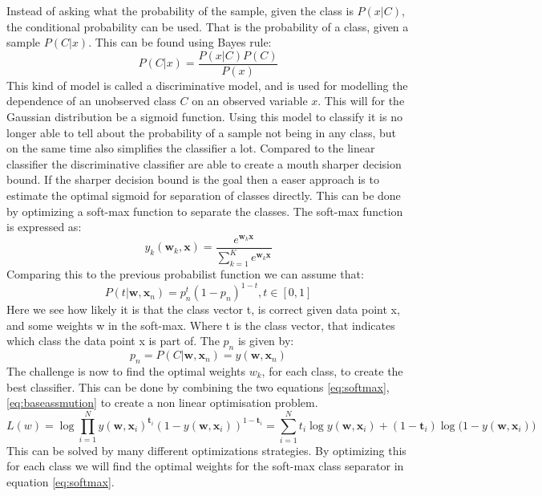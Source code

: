 Instead of asking what the probability of the sample, given the class is $P(x|C)$, the conditional probability can be used. That is the probability of a class, given a sample $P(C|x)$. This can be found using Bayes rule:
\begin{equation}
 P(C|x)=\frac{P(x|C)P(C)}{P(x)}
\end{equation}
This kind of model is called a discriminative model, and is used for modelling the dependence of an unobserved class $C$ on an observed variable $x$. This will for the Gaussian distribution be a sigmoid function. Using this model to classify it is no longer able to tell about the probability of a sample not being in any class, but on the same time also simplifies the classifier a lot. Compared to the linear classifier the discriminative classifier are able to create a mouth sharper decision bound. If the sharper decision bound is the goal then a easer approach is to estimate the optimal sigmoid for separation of classes directly. This can be done by optimizing a soft-max function to separate the classes. The soft-max function is expressed as: 
\begin{equation}
\label{eq:softmax}
 y_k(\textbf{w}_k,\textbf{x})=\frac{e^{\textbf{w}_k \textbf{x}}}{\sum\limits_{k=1}^K e^{\textbf{w}_k \textbf{x}}}
\end{equation}
Comparing this to the previous probabilist function we can assume that:
\begin{equation}
\label{eq:baseassmution}
 P(t|\textbf{w},\textbf{x}_n) = p_n^t (1-p_n)^{1-t} , t \in [0,1] 
\end{equation}
Here we see how likely it is that the class vector t, is correct given data point x, and some weights w in the soft-max.  Where t is the class vector, that indicates which class the data point x is part of.  The $p_n$ is given by: 
\begin{equation}
 p_n = P(C| \textbf{w}, \textbf{x}_n) = y(\textbf{w},\textbf{x}_n)
\end{equation}
The challenge is now to find the optimal weights $w_k$, for each class, to create the best classifier. This can be done by combining the two equations \ref{eq:softmax}, \ref{eq:baseassmution} to create a non linear optimisation problem.
\begin{equation}
 L(w) = \log{\prod\limits_{i=1}^N y(\textbf{w},\textbf{x}_i)^{\textbf{t}_i} ( 1-y(\textbf{w},\textbf{x}_i))^{1-\textbf{t}_i}}
 = \sum\limits_{i=1}^N t_i\log{y(\textbf{w},\textbf{x}_i)}+(1-\textbf{t}_i)\log({1-y(\textbf{w},\textbf{x}_i))}
\end{equation}
This can be solved by many different optimizations strategies. By optimizing this for each class we will find the optimal weights for the soft-max class separator in equation \ref{eq:softmax}.\\

